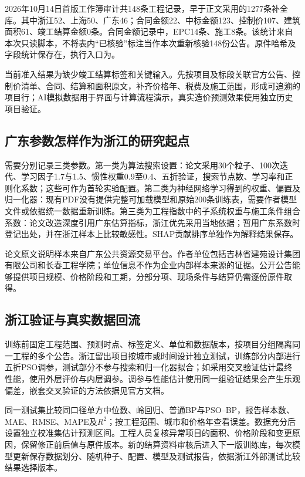 2026年10月14日首版工作簿审计共148条工程记录，早于正文采用的1277条补全库。其中浙江52、上海50、广东46；合同金额22、中标金额123、控制价107、建筑面积61、竣工结算金额0条。合同金额记录中，EPC14条、施工8条。该统计来自本次只读脚本，不将表内“已核验”标注当作本次重新核验148份公告。原件哈希及字段统计保存在，执行入口为。

当前准入结果为缺少竣工结算标签和关键输入。先按项目及标段关联官方公告、控制价清单、合同、结算和面积原文，补齐价格年、税费及施工范围，形成可追溯的项目行；AI模拟数据用于界面与计算流程演示，真实造价预测效果使用独立历史项目验证。

\subsection{广东参数怎样作为浙江的研究起点}

需要分别记录三类参数。第一类为算法搜索设置：论文采用30个粒子、100次迭代、学习因子1.7与1.5、惯性权重0.9至0.4、五折验证，搜索节点数、学习率和正则化系数；这些可作为首轮实验配置。第二类为神经网络学习得到的权重、偏置及归一化器：现有PDF没有提供完整可加载模型和原始200条训练表，需要作者模型文件或依据统一数据重新训练。第三类为工程指数中的子系统权重与施工条件组合系数：论文改造深度引用广东估算指标，浙江优先采用当地依据；暂用广东系数时登记出处，并在浙江样本上比较敏感性。SHAP贡献排序单独作为解释结果保存。\cite{psobp2026}

论文原文说明样本来自广东公共资源交易平台。作者单位包括吉林省建苑设计集团有限公司和长春工程学院；单位信息不作为企业内部样本来源的证据。公开公告能够提供项目规模、价格阶段和工期，分部分项、现场条件与结算仍需逐份原件取得。

\subsection{浙江验证与真实数据回流}

训练前固定工程范围、预测时点、标签定义、单位和数据版本，按项目分组隔离同一工程的多个公告。浙江留出项目按城市或时间设计独立测试，训练部分内部进行五折PSO调参，测试部分不参与搜索和归一化器拟合；如采用交叉验证估计最终性能，使用外层评价与内层调参。调参与性能估计使用同一组验证结果会产生乐观偏差，嵌套交叉验证的方法依据见官方文档。\cite{nestedcv}

同一测试集比较同口径单方中位数、岭回归、普通BP与PSO--BP，报告样本数、MAE、RMSE、MAPE及$R^2$；按工程范围、城市和价格年查看误差。数据充分后设置独立校准集估计预测区间。工程人员复核异常项目的面积、价格阶段和变更原因，保留修正前后值与原件版本。新的结算资料审核后进入下一版训练库，每次模型更新保存数据划分、随机种子、配置、模型及测试报告，依据浙江外部测试比较结果选择版本。

